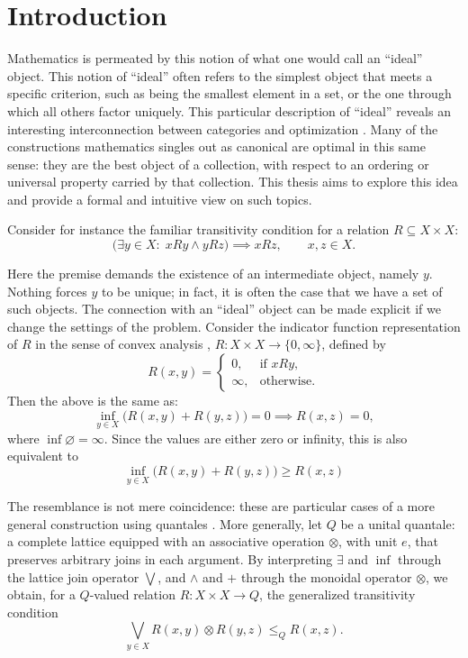 \chapter{Introduction}

Mathematics is permeated by this notion of what one
would call an ``ideal'' object. This notion of ``ideal'' often refers to the
simplest object that meets a specific criterion, such as being the smallest
element in a set, or the one through which all others factor uniquely.
This particular description of ``ideal'' reveals an interesting
interconnection between categories and optimization \cite{Khadh2026bridging}.
Many of the constructions mathematics singles
out as canonical are optimal in this same sense: they are the best object of a
collection, with respect to an ordering or universal property carried by that
collection. This thesis aims to explore this idea and provide a formal and
intuitive view on such topics.

Consider for instance the familiar transitivity condition for a relation
$R\subseteq X\times X$:
\[
\bigl(\exists y\in X:\;xRy\wedge yRz\bigr)\implies xRz,
\qquad x,z\in X.
\]

Here the premise demands the existence of an intermediate object, namely $y$.
Nothing forces $y$ to be unique; in fact, it is often the case that we have
a set of such objects. The connection with an ``ideal'' object can be made
explicit if we change the settings of the problem. Consider the indicator function
representation of $R$ in the sense of convex analysis \cite{rockafellar1970convex},
$R:X\times X\to\{0,\infty\}$, defined by
\[
R(x,y)=
\begin{cases}
0, & \text{if }xRy,\\
\infty, & \text{otherwise}.
\end{cases}
\]
Then the above is the same as:
\[
\inf_{y\in X}\bigl(R(x,y)+R(y,z)\bigr)=0
\implies R(x,z)=0,
\]
where $\inf\varnothing=\infty$.
Since the values are either zero or infinity, this is also equivalent to
\[
\inf_{y\in X}\bigl(R(x,y)+R(y,z)\bigr) 
\ge R(x,z)
\]

The resemblance is not mere coincidence: these are particular cases of
a more general construction using quantales
\cite{lawvere1973metric}.
More generally, let $Q$ be a unital quantale: a complete lattice equipped
with an associative operation $\otimes$, with unit $e$, that preserves
arbitrary joins in each argument.
By interpreting $\exists$ and $\inf$ through the lattice join
operator $\bigvee$, and $\wedge$ and $+$ through the monoidal operator
$\otimes$, we obtain, for a $Q$-valued relation
$R:X\times X\to Q$, the generalized transitivity condition
\[
\bigvee_{y\in X}R(x,y)\otimes R(y,z)\le_Q R(x,z).
\]

